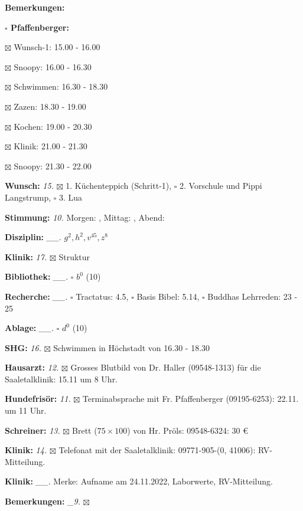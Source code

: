 \documentclass[10pt,a4paper]{article}
\newcommand\prop[1] {{\color {alizarin} {\bf #1}}}             %
\newcommand\opti[1] {{\color {amethyst} {\bf #1}}}             %
\newcommand\mand[1] {{\color {burntorange} {\bf #1}}}          %
\newcommand\bottomspace{\vskip 4pt}
\newcommand\n[1] { {\sl #1.} \hskip 5pt }
\begin{document}
\begin{mdframed}[style=daystyle]
\begin{labeling}{{\mand {Bemerkungen:}}}
\begin{minipage}{0.75\textwidth}
\begin{labeling}{\prop {$\square$ {Pfaffenberger:}}}
      \item[$\boxtimes$ Wunsch-1:]      15.00 - 16.00
      \item[$\boxtimes$ Snoopy:]        16.00 - 16.30
      \item[$\boxtimes$ Schwimmen:]     16.30 - 18.30
      \item[$\boxtimes$ Zazen:]         18.30 - 19.00
      \item[$\boxtimes$ Kochen:]        19.00 - 20.30
      \item[$\boxtimes$ Klinik:]        21.00 - 21.30
      \item[$\boxtimes$ Snoopy:]        21.30 - 22.00
      \end{labeling}
    \end{minipage}
    \bottomspace
  \item[{\mand {Wunsch:}}]         \n{15} $\boxtimes$ 1. Küchenteppich (Schritt-1),
      $\square$ 2. Vorschule und Pippi Langstrump, $\square$ 3. Lua
  \item[{\mand {Stimmung:}}]       \n{10} Morgen: , Mittag: , Abend: 
  \item[{\mand {Disziplin:}}]    \n{\_\_} $g^{2}, h^{2}, v^{45}, z^{8}$
  \item[{\mand {Klinik:}}]         \n{17} $\boxtimes$ Struktur
  \item[{\mand {Bibliothek:}}]   \n{\_\_} $\square$ $b^{0}$ (10)
  \item[{\mand {Recherche:}}]    \n{\_\_} $\square$ Tractatus: 4.5, $\square$ Basis Bibel: 5.14,
      $\square$ Buddhas Lehrreden: 23 - 25
  \item[{\mand {Ablage:}}]       \n{\_\_} $\square$ $d^{0}$ (10)
  \item[{\mand {SHG:}}]            \n{16} $\boxtimes$ Schwimmen in Höchstadt von 16.30 - 18.30
  \item[{\opti {Hausarzt:}}]       \n{12} $\boxtimes$ Grosses Blutbild von Dr. Haller (09548-1313) für die
    Saaletalklinik: 15.11 um 8 Uhr.
  \item[{\opti {Hundefrisör:}}]    \n{11} $\boxtimes$ Terminabsprache mit Fr. Pfaffenberger (09195-6253): 22.11. um 11 Uhr.
  \item[{\opti {Schreiner:}}]      \n{13} $\boxtimes$ Brett ($75 \times 100$) von Hr. Pröls: 09548-6324: 30 \euro
  \item[{\opti {Klinik:}}]         \n{14} $\boxtimes$ Telefonat mit der Saaletalklinik: 09771-905-(0, 41006):
    RV-Mitteilung.
  \item[{\opti {Klinik:}}]       \n{\_\_} Merke: Aufname am 24.11.2022, Laborwerte, RV-Mitteilung.
  \item[{\mand {Bemerkungen:}}]   \n{\_9} $\boxtimes$
  \end{labeling}
    

\end{mdframed}
\end{document}

